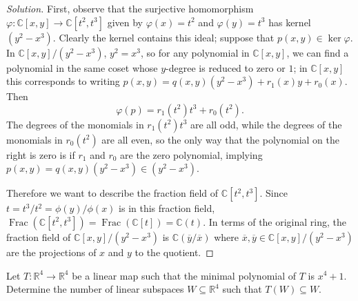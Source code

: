 \documentclass[10pt]{article}
\providecommand{\ol}{\overline}
\providecommand{\CC}{\mathbb C}
\providecommand{\RR}{\mathbb R}
\newenvironment{soln}{\begin{proof}[Solution]}{\end{proof}}
\begin{document}
\begin{soln}
    First, observe that the surjective homomorphism
    $\varphi\colon\CC[x,y]\to\CC[t^2, t^3]$
    given by $\varphi(x) = t^2$ and $\varphi(y) = t^3$
    has kernel $(y^2 - x^3)$. Clearly the kernel contains this ideal;
    suppose that $p(x,y)\in\ker\varphi$.
    In $\CC[x,y]/(y^2 - x^3)$, $y^2 = x^3$, so for any polynomial in $\CC[x,y]$,
    we can find a polynomial in the same coset whose $y$-degree is
    reduced to zero or $1$; in $\CC[x,y]$ this corresponds to writing
    $p(x,y) = q(x,y)(y^2 - x^3) + r_1(x)y + r_0(x)$. Then
    \begin{equation*}
        \varphi(p) = r_1(t^2)t^3 + r_0(t^2).
    \end{equation*}
    The degrees of the monomials in $r_1(t^2)t^3$ are all odd,
    while the degrees of the monomials in $r_0(t^2)$ are all even,
    so the only way that the polynomial on the right is zero
    is if $r_1$ and $r_0$ are the zero polynomial, implying
    $p(x,y) = q(x,y)(y^2 - x^3)\in (y^2 - x^3)$.

    Therefore we want to describe the fraction field of
    $\CC[t^2,t^3]$. Since $t = t^3/t^2 = \phi(y)/\phi(x)$
    is in this fraction field, $\operatorname{Frac}(\CC[t^2,t^3])
    = \operatorname{Frac}(\CC[t]) = \CC(t)$.
    In terms of the original ring, the fraction field of $\CC[x,y]/(y^2 - x^3)$
    is $\CC(\ol y/\ol x)$ where $\ol x,\ol y\in\CC[x,y]/(y^2 - x^3)$
    are the projections of $x$ and $y$ to the quotient.
\end{soln}

\pagebreak

\begin{problem}
    Let $T\colon\RR^4\to\RR^4$ be a linear map such that
    the minimal polynomial of $T$ is $x^4 + 1$.
    Determine the number of linear subspaces
    $W\subseteq\RR^4$ such that $T(W)\subseteq W$.
\end{problem}
\end{document}
